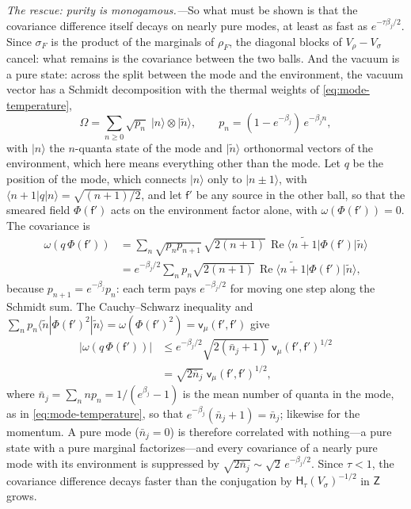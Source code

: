 \documentclass[aps,prl,reprint,longbibliography,raggedbottom]{revtex4-2}
\newcommand{\abs}[1]{\lvert #1\rvert}
\newcommand{\Therm}{\mathsf H}
\newcommand{\cov}{\mathsf v}
\newcommand{\sy}{\mathsf f'}
\begin{document}
\emph{The rescue: purity is monogamous.---}So what must be shown
is that the covariance difference itself decays on nearly pure modes,
at least as fast as $e^{-\tau\beta_j/2}$. Since
$\sigma_F$ is the product of the marginals of $\rho_F$, the diagonal
blocks of $V_\rho-V_\sigma$ cancel: what remains is the covariance
between the two balls. And the vacuum is a pure state: across the
split between the mode and the environment, the vacuum vector has a
Schmidt decomposition with the thermal weights of
\eqref{eq:mode-temperature},
\[
\Omega=\sum_{n\ge0}\sqrt{p_n}\;|n\rangle\otimes|\widetilde
n\rangle,\qquad p_n=(1-e^{-\beta_j})\,e^{-\beta_jn},
\]
with $|n\rangle$ the $n$-quanta state of the mode and
$|\widetilde n\rangle$ orthonormal vectors of the environment, which
here means everything other than the mode. Let $q$ be the position of
the mode, which connects $|n\rangle$ only to $|n\pm1\rangle$, with
$\langle n+1|q|n\rangle=\sqrt{(n+1)/2}$, and let $\sy$ be any source
in the other ball, so that the smeared field $\Phi(\sy)$ acts on the
environment factor alone, with $\omega(\Phi(\sy))=0$. The covariance
is
\[
\begin{aligned}
\omega(q\,\Phi(\sy))&=\sum_{n}\sqrt{p_np_{n+1}}\,\sqrt{2(n+1)}\,
\operatorname{Re}\langle\widetilde{n+1}|\Phi(\sy)|\widetilde n\rangle\\
&=e^{-\beta_j/2}\sum_np_n\sqrt{2(n+1)}\,
\operatorname{Re}\langle\widetilde{n+1}|\Phi(\sy)|\widetilde n\rangle,
\end{aligned}
\]
because $p_{n+1}=e^{-\beta_j}p_n$: each term pays
$e^{-\beta_j/2}$ for moving one step along the Schmidt sum. The
Cauchy--Schwarz inequality and
$\sum_np_n\langle\widetilde n|\Phi(\sy)^2|\widetilde n\rangle
=\omega(\Phi(\sy)^2)=\cov_\mu(\sy,\sy)$ give
\[
\begin{aligned}
\abs{\omega(q\,\Phi(\sy))}
&\le e^{-\beta_j/2}\sqrt{2(\bar n_j+1)}\;\cov_\mu(\sy,\sy)^{1/2}\\
&=\sqrt{2\bar n_j}\;\cov_\mu(\sy,\sy)^{1/2},
\end{aligned}
\]
where $\bar n_j=\sum_nnp_n=1/(e^{\beta_j}-1)$ is the mean
number of quanta in the mode, as in \eqref{eq:mode-temperature}, so
that $e^{-\beta_j}(\bar n_j+1)=\bar n_j$; likewise for the momentum. A
pure mode ($\bar n_j=0$) is
therefore correlated with nothing---a pure state with a pure marginal
factorizes---and every covariance of a nearly pure mode with its
environment is suppressed by $\sqrt{2\bar n_j}\sim\sqrt2\,e^{-\beta_j/2}$.
Since $\tau<1$, the
covariance difference decays faster than the conjugation by
$\Therm_\tau(V_\sigma)^{-1/2}$ in $\mathsf Z$ grows.
\end{document}
